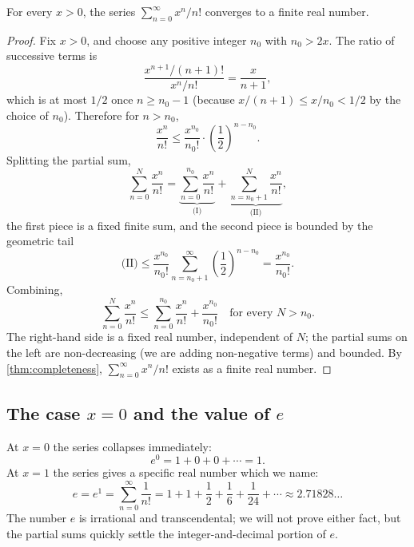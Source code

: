 \begin{theorem}\label{thm:exp-series-converges-positive}
For every \(x > 0\), the series \(\sum_{n = 0}^{\infty} x^{n}/n!\) converges to a finite real number.
\end{theorem}

\begin{proof}
Fix \(x > 0\), and choose any positive integer \(n_{0}\) with \(n_{0} > 2x\). The ratio of successive terms is
\[
\frac{x^{n + 1}/(n + 1)!}{x^{n}/n!} = \frac{x}{n + 1},
\]
which is at most \(1/2\) once \(n \geq n_{0} - 1\) (because \(x/(n + 1) \leq x/n_{0} < 1/2\) by the choice of \(n_{0}\)). Therefore for \(n > n_{0}\),
\[
\frac{x^{n}}{n!} \leq \frac{x^{n_{0}}}{n_{0}!} \cdot \left(\frac{1}{2}\right)^{n - n_{0}}.
\]
Splitting the partial sum,
\[
\sum_{n = 0}^{N} \frac{x^{n}}{n!}
= \underbrace{\sum_{n = 0}^{n_{0}} \frac{x^{n}}{n!}}_{\text{(I)}}
+ \underbrace{\sum_{n = n_{0} + 1}^{N} \frac{x^{n}}{n!}}_{\text{(II)}},
\]
the first piece is a fixed finite sum, and the second piece is bounded by the geometric tail
\[
\text{(II)} \leq \frac{x^{n_{0}}}{n_{0}!} \sum_{n = n_{0} + 1}^{\infty} \left(\frac{1}{2}\right)^{n - n_{0}}
= \frac{x^{n_{0}}}{n_{0}!}.
\]
Combining,
\[
\sum_{n = 0}^{N} \frac{x^{n}}{n!} \leq \sum_{n = 0}^{n_{0}} \frac{x^{n}}{n!} + \frac{x^{n_{0}}}{n_{0}!}
\quad \text{for every } N > n_{0}.
\]
The right-hand side is a fixed real number, independent of \(N\); the partial sums on the left are non-decreasing (we are adding non-negative terms) and bounded. By \cref{thm:completeness}, \(\sum_{n = 0}^{\infty} x^{n}/n!\) exists as a finite real number.
\end{proof}

\subsection{The case \texorpdfstring{$x = 0$}{x = 0} and the value of \texorpdfstring{$e$}{e}}

At \(x = 0\) the series collapses immediately:
\[
e^{0} = 1 + 0 + 0 + \dotsb = 1.
\]
At \(x = 1\) the series gives a specific real number which we name:
\[
e = e^{1} = \sum_{n = 0}^{\infty} \frac{1}{n!} = 1 + 1 + \frac{1}{2} + \frac{1}{6} + \frac{1}{24} + \dotsb \approx 2.71828\dots
\]
The number \(e\) is irrational and transcendental; we will not prove either fact, but the partial sums quickly settle the integer-and-decimal portion of \(e\).

